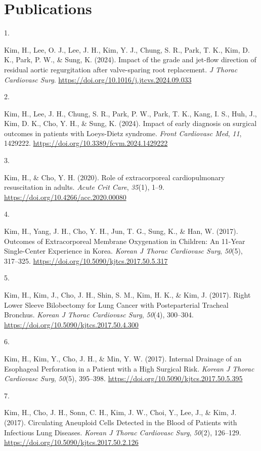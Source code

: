\documentclass[11pt,a4paper,]{moderncv}
\newlength{\cslhangindent}
\newlength{\csllabelwidth}
\newenvironment{CSLReferences}[2] %
 {\begin{list}{}{%
  \setlength{\itemindent}{0pt}
  \setlength{\leftmargin}{0pt}
  \setlength{\parsep}{0pt}
  \ifodd #1
   \setlength{\leftmargin}{\cslhangindent}
   \setlength{\itemindent}{-1\cslhangindent}
  \fi
  \setlength{\itemsep}{#2\baselineskip}}}
 {\end{list}}
\newcommand{\CSLLeftMargin}[1]{\parbox[t]{\csllabelwidth}{\strut#1\strut}}
\newcommand{\CSLRightInline}[1]{\parbox[t]{\linewidth - \csllabelwidth}{\strut#1\strut}}
\begin{document}
\section{Publications}\label{publications}

\label{refs-37a58b3d882eec18e7a9197b833691ca}
\begin{CSLReferences}{0}{0}
\CSLLeftMargin{1. }%
\CSLRightInline{Kim, H., Lee, O. J., Lee, J. H., Kim, Y. J., Chung, S.
R., Park, T. K., Kim, D. K., Park, P. W., \& Sung, K. (2024). Impact of
the grade and jet-flow direction of residual aortic regurgitation after
valve-sparing root replacement. \emph{J Thorac Cardiovasc Surg}.
\url{https://doi.org/10.1016/j.jtcvs.2024.09.033}}

\CSLLeftMargin{2. }%
\CSLRightInline{Kim, H., Lee, J. H., Chung, S. R., Park, P. W., Park, T.
K., Kang, I. S., Huh, J., Kim, D. K., Cho, Y. H., \& Sung, K. (2024).
Impact of early diagnosis on surgical outcomes in patients with
Loeys-Dietz syndrome. \emph{Front Cardiovasc Med}, \emph{11}, 1429222.
\url{https://doi.org/10.3389/fcvm.2024.1429222}}

\CSLLeftMargin{3. }%
\CSLRightInline{Kim, H., \& Cho, Y. H. (2020). Role of extracorporeal
cardiopulmonary resuscitation in adults. \emph{Acute Crit Care},
\emph{35}(1), 1--9. \url{https://doi.org/10.4266/acc.2020.00080}}

\CSLLeftMargin{4. }%
\CSLRightInline{Kim, H., Yang, J. H., Cho, Y. H., Jun, T. G., Sung, K.,
\& Han, W. (2017). Outcomes of Extracorporeal Membrane Oxygenation in
Children: An 11-Year Single-Center Experience in Korea. \emph{Korean J
Thorac Cardiovasc Surg}, \emph{50}(5), 317--325.
\url{https://doi.org/10.5090/kjtcs.2017.50.5.317}}

\CSLLeftMargin{5. }%
\CSLRightInline{Kim, H., Kim, J., Cho, J. H., Shin, S. M., Kim, H. K.,
\& Kim, J. (2017). Right Lower Sleeve Bilobectomy for Lung Cancer with
Posteparterial Tracheal Bronchus. \emph{Korean J Thorac Cardiovasc
Surg}, \emph{50}(4), 300--304.
\url{https://doi.org/10.5090/kjtcs.2017.50.4.300}}

\CSLLeftMargin{6. }%
\CSLRightInline{Kim, H., Kim, Y., Cho, J. H., \& Min, Y. W. (2017).
Internal Drainage of an Esophageal Perforation in a Patient with a High
Surgical Risk. \emph{Korean J Thorac Cardiovasc Surg}, \emph{50}(5),
395--398. \url{https://doi.org/10.5090/kjtcs.2017.50.5.395}}

\CSLLeftMargin{7. }%
\CSLRightInline{Kim, H., Cho, J. H., Sonn, C. H., Kim, J. W., Choi, Y.,
Lee, J., \& Kim, J. (2017). Circulating Aneuploid Cells Detected in the
Blood of Patients with Infectious Lung Diseases. \emph{Korean J Thorac
Cardiovasc Surg}, \emph{50}(2), 126--129.
\url{https://doi.org/10.5090/kjtcs.2017.50.2.126}}

\end{CSLReferences}
\end{document}

